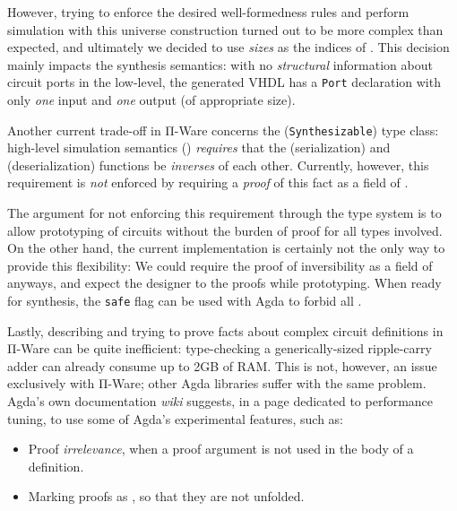             However, trying to enforce the desired well-formedness rules and perform simulation
            with this universe construction turned out to be more complex than expected,
            and ultimately we decided to use \emph{sizes} as the indices of .
            This decision mainly impacts the synthesis semantics:
            with no \emph{structural} information about circuit ports in the low-level,
            the generated \ac{VHDL} has a \texttt{Port} declaration with only
            \emph{one} input and \emph{one} output (of appropriate size).

            Another current trade-off in Π-Ware concerns the  (\texttt{Synthesizable})
            type class: high-level simulation semantics () \emph{requires} that the
             (serialization) and  (deserialization) functions be \emph{inverses} of each other.
            Currently, however, this requirement is \emph{not} enforced by requiring a \emph{proof} of
            this fact as a field of .

            The argument for not enforcing this requirement through the type system is to allow
            prototyping of circuits without the burden of proof for all types involved.
            On the other hand, the current implementation is certainly not the only way to provide this flexibility:
            We could require the proof of inversibility as a field of  anyways,
            and expect the designer to  the proofs while prototyping.
            When ready for synthesis, the \texttt{safe} flag can be used with Agda to forbid all .

            Lastly, describing and trying to prove facts about complex circuit definitions in Π-Ware
            can be quite inefficient: type-checking a generically-sized ripple-carry adder can already
            consume up to 2GB of RAM.
            This is not, however, an issue exclusively with Π-Ware; other Agda libraries suffer with the same problem.
            Agda's own documentation \emph{wiki} suggests, in a page dedicated to performance tuning,
            to use some of Agda's experimental features, such as:

            \begin{itemize}
                \item Proof \emph{irrelevance}, when a proof argument is not used in the body of a definition.
                \item Marking proofs as , so that they are not unfolded.
            \end{itemize}

